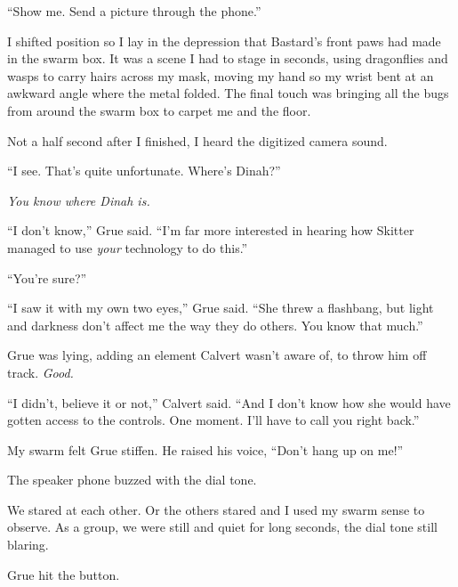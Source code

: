 ``Show me.  Send a picture through the phone.''



I shifted position so I lay in the depression that Bastard's front paws had made in the swarm box.  It was a scene I had to stage in seconds, using dragonflies and wasps to carry hairs across my mask, moving my hand so my wrist bent at an awkward angle where the metal folded.  The final touch was bringing all the bugs from around the swarm box to carpet me and the floor.



Not a half second after I finished, I heard the digitized camera sound.



``I see.  That's quite unfortunate.  Where's Dinah?''



\emph{You know where Dinah is.}



``I don't know,'' Grue said.  ``I'm far more interested in hearing how Skitter managed to use \emph{your} technology to do this.''



``You're sure?''



``I saw it with my own two eyes,'' Grue said.  ``She threw a flashbang, but light and darkness don't affect me the way they do others.  You know that much.''



Grue was lying, adding an element Calvert wasn't aware of, to throw him off track.\emph{  Good.}



``I didn't, believe it or not,'' Calvert said.  ``And I don't know how she would have gotten access to the controls.  One moment.  I'll have to call you right back.''



My swarm felt Grue stiffen.  He raised his voice, ``Don't hang up on me!''



The speaker phone buzzed with the dial tone.



We stared at each other.  Or the others stared and I used my swarm sense to observe.  As a group, we were still and quiet for long seconds, the dial tone still blaring.



Grue hit the button.



